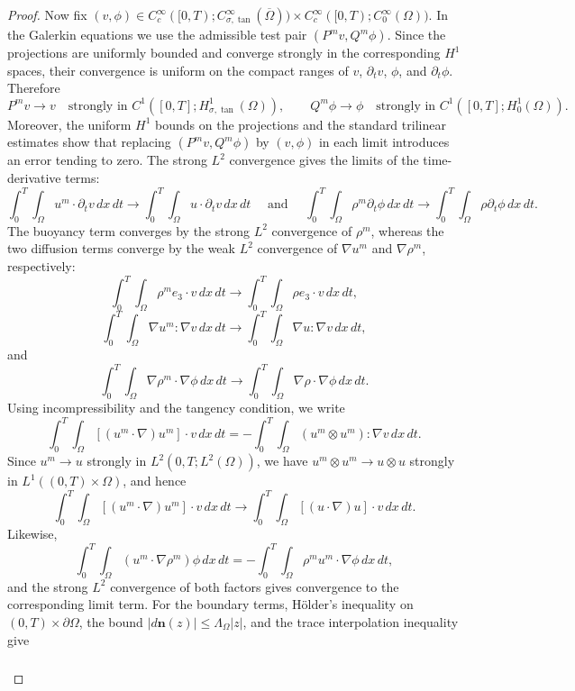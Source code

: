 \documentclass[11pt,reqno]{amsart}
\theoremstyle{plain}
\numberwithin{equation}{section}
\begin{document}
\begin{proof}
Now fix $(v,\phi)\in C_c^\infty([0,T);C^\infty_{\sigma,\tan}(\overline{\Omega}))
\times C_c^\infty([0,T);C_0^\infty(\Omega))$. In the Galerkin equations we use the admissible test pair $(P^mv,Q^m\phi)$. Since the projections are uniformly bounded and converge strongly in the corresponding $H^1$ spaces, their convergence is uniform on the compact ranges of $v$, $\partial_tv$, $\phi$, and $\partial_t\phi$. Therefore
\[
P^mv\to v
\quad\text{strongly in }C^1([0,T];H^1_{\sigma,\tan}(\Omega)),
\qquad
Q^m\phi\to\phi
\quad\text{strongly in }C^1([0,T];H^1_0(\Omega)).
\]
Moreover, the uniform $H^1$ bounds on the projections and the standard trilinear estimates show that replacing $(P^m v,Q^m\phi)$ by $(v,\phi)$ in each limit introduces an error tending to zero. The strong \(L^2\) convergence gives the limits of the
time-derivative terms:
\[
\int_0^T\int_\Omega u^m\cdot\partial_tv\,dx\,dt\rightarrow\int_0^T\int_\Omega u\cdot\partial_tv\,dx\,dt\quad\text{ and }\quad \int_0^T\int_\Omega\rho^m\partial_t\phi \,dx\,dt\rightarrow\int_0^T\int_\Omega\rho\partial_t\phi\,dx\,dt.
\]
The buoyancy term converges by the strong \(L^2\) convergence of \(\rho^m\),
whereas the two diffusion terms converge by the weak \(L^2\) convergence of
\(\nabla u^m\) and \(\nabla\rho^m\), respectively:
\[
\int_0^T\int_\Omega\rho^m e_3\cdot v\,dx\,dt\rightarrow\int_0^T\int_\Omega\rho e_3\cdot v\,dx\,dt,
\]
\[
\int_0^T\int_\Omega \nabla u^m:\nabla v\,dx\,dt\rightarrow\int_0^T\int_\Omega \nabla u:\nabla v\,dx\,dt,
\]
and
\[
\int_0^T\int_\Omega \nabla\rho^m\cdot\nabla\phi\,dx\,dt\rightarrow\int_0^T\int_\Omega \nabla\rho\cdot\nabla\phi\,dx\,dt.
\]
Using incompressibility and the tangency condition, we write
\[
\int_0^T\int_\Omega [(u^m\cdot\nabla)u^m]\cdot v\,dx\,dt
=-\int_0^T\int_\Omega (u^m\otimes u^m):\nabla v\,dx\,dt.
\]
Since $u^m\to u$ strongly in $L^2(0,T;L^2(\Omega))$, we have
$u^m\otimes u^m\to u\otimes u$ strongly in $L^1((0,T)\times\Omega)$, and hence
\[
\int_0^T\int_\Omega [(u^m\cdot\nabla)u^m]\cdot v\,dx\,dt
\longrightarrow
\int_0^T\int_\Omega [(u\cdot\nabla)u]\cdot v\,dx\,dt.
\]
Likewise,
\[
\int_0^T\int_\Omega (u^m\cdot\nabla\rho^m)\phi\,dx\,dt
=-\int_0^T\int_\Omega \rho^m u^m\cdot\nabla\phi\,dx\,dt,
\]
and the strong $L^2$ convergence of both factors gives convergence to the corresponding limit term.
For the boundary terms, H\"older's inequality on
\((0,T)\times\partial\Omega\), the bound
\(|d\boldsymbol n(z)|\le\Lambda_\Omega|z|\), and the trace interpolation
inequality give
\begin{align}\label{boundest}
\begin{split}

\end{split}
\end{align}
\end{proof}
\end{document}
